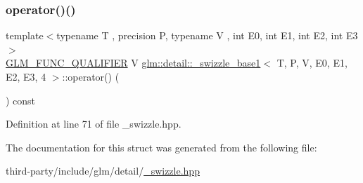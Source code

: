 \subsubsection{\texorpdfstring{operator()()}{operator()()}}
{\footnotesize\ttfamily template$<$typename T , precision P, typename V , int E0, int E1, int E2, int E3$>$ \\
\hyperlink{setup_8hpp_a33fdea6f91c5f834105f7415e2a64407}{G\+L\+M\+\_\+\+F\+U\+N\+C\+\_\+\+Q\+U\+A\+L\+I\+F\+I\+ER} V \hyperlink{structglm_1_1detail_1_1__swizzle__base1}{glm\+::detail\+::\+\_\+swizzle\+\_\+base1}$<$ T, P, V, E0, E1, E2, E3, 4 $>$\+::operator() (\begin{DoxyParamCaption}{ }\end{DoxyParamCaption}) const\hspace{0.3cm}{\ttfamily [inline]}}



Definition at line 71 of file \+\_\+swizzle.\+hpp.



The documentation for this struct was generated from the following file\+:\begin{DoxyCompactItemize}
\item 
third-\/party/include/glm/detail/\hyperlink{__swizzle_8hpp}{\+\_\+swizzle.\+hpp}\end{DoxyCompactItemize}
